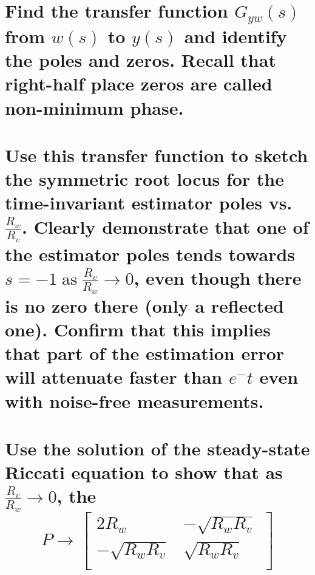 \documentclass[12pt,letterpaper, onecolumn]{exam}
\begin{document}
\begin{questions}
\begin{parts}
    \end{parts}
    \clearpage
    \begin{parts}
        \part{Find the transfer function $G_{yw}(s)$ from $w(s)$ to $y(s)$ and identify the poles and zeros. Recall that right-half place zeros are called non-minimum phase.}

        \part{Use this transfer function to sketch the symmetric root locus for the time-invariant estimator poles vs. $\frac{R_w}{R_v}$. Clearly demonstrate that one of the estimator poles tends towards $s  = -1\;\text{as}\;\frac{R_v}{R_w} \rightarrow 0$, even though there is no zero there (only a reflected one). Confirm that this implies that part of the estimation error will attenuate faster than $e^-t$ even with noise-free measurements.}

        \part{Use the solution of the steady-state Riccati equation to show that as $\frac{R_v}{R_w} \rightarrow 0$, the
            \begin{equation*}
                P \rightarrow
                \begin{bmatrix}
                    2R_w            & -\sqrt{R_w R_v} \\
                    -\sqrt{R_w R_v} & \sqrt{R_w R_v}  \\
                \end{bmatrix}
            \end{equation*}}


\end{parts}
\end{questions}
\end{document}
